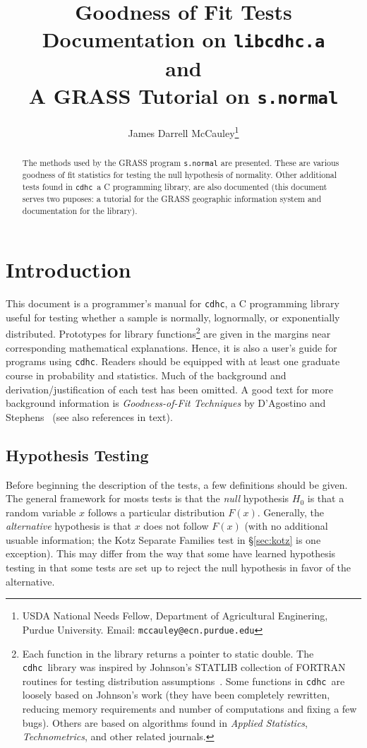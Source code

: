 \documentclass[draft]{article}
\title{Goodness of Fit Tests\\ 
{\large Documentation on {\tt libcdhc.a}}\\
{\large and}\\
{\large A GRASS Tutorial on {\tt s.normal}}}
\author{James Darrell McCauley\thanks{USDA National Needs Fellow,
Department of Agricultural Enginering, Purdue University. Email:
{\tt mccauley@ecn.purdue.edu}}}
\def\libname{{\tt cdhc}}
\begin{document}

\maketitle

\begin{abstract}
The methods used by the GRASS program {\tt s.normal}
are presented. These are various goodness of fit statistics for testing
the null hypothesis of normality. Other additional tests found in
\libname\, a C programming library, 
are also documented (this document serves two puposes:
a tutorial for the GRASS geographic information system
and documentation for the library).
\end{abstract}

\section{Introduction}

This document is a programmer's 
manual for \libname, a C programming library useful
for testing whether a sample is normally, lognormally,
or exponentially distributed.
Prototypes for library functions\footnote{%
Each function in the library returns a pointer to static double.
The \libname\ library was inspired by Johnson's
STATLIB collection of FORTRAN routines for testing 
distribution assumptions~\protect\cite{johnson94}.  
Some functions in \libname\
are loosely based on Johnson's work (they have been completely
rewritten, reducing memory requirements and number
of computations and fixing a few bugs). Others are based on
algorithms found in \emph{Applied Statistics}, \emph{Technometrics},
and other related journals.} 
are given in the margins near
corresponding mathematical explanations. Hence, it is also
a user's guide for programs using \libname.
Readers should be equipped with at least one graduate course
in probability and statistics. Much of the background
and derivation/justification of each test has been
omitted. A good text for more background information
is {\em Goodness-of-Fit Techniques\/} by
D'Agostino and Stephens~\cite{dagostino86b} (see also references in text). 

\subsection{Hypothesis Testing}

Before beginning the description of the tests, a few definitions
should be given. The general framework for mosts tests is that
the {\em null\/} hypothesis \(H_0\) is that a random variable \(x\)
follows a particular distribution \(F\left(x\right)\). 
Generally, the {\em alternative\/} hypothesis is that
\(x\) does not follow \(F\left(x\right)\) (with no additional
usuable information; the Kotz Separate Families test in \S\ref{sec:kotz}
is one exception). 
This may differ from the way that some have learned hypothesis testing
in that some tests are set up to reject the null hypothesis in
favor of the alternative.
\end{document}
